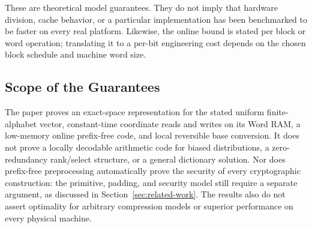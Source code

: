These are theoretical model guarantees.  They do not imply that hardware
division, cache behavior, or a particular implementation has been benchmarked
to be faster on every real platform.  Likewise, the online bound is stated
per block or word operation; translating it to a per-bit engineering cost
depends on the chosen block schedule and machine word size.

\subsection{Scope of the Guarantees}

The paper proves an exact-space representation for the stated uniform
finite-alphabet vector, constant-time coordinate reads and writes on its Word
RAM, a low-memory online prefix-free code, and local reversible base
conversion.  It does not prove a locally decodable arithmetic code for biased
distributions, a zero-redundancy rank/select structure, or a general
dictionary solution.  Nor does prefix-free preprocessing automatically prove
the security of every cryptographic construction: the primitive, padding,
and security model still require a separate argument, as discussed in
Section~\ref{sec:related-work}.  The results also do not assert optimality for
arbitrary compression models or superior performance on every physical
machine.
